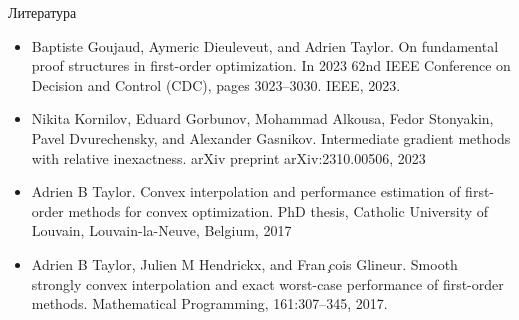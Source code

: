 \documentclass{beamer}
\begin{document}
\begin{frame}{Литература}

\begin{itemize}
 \item Baptiste Goujaud, Aymeric Dieuleveut, and Adrien Taylor. On fundamental proof structures in first-order
optimization. In 2023 62nd IEEE Conference on Decision and Control (CDC), pages 3023–3030. IEEE,
2023.
 \item Nikita Kornilov, Eduard Gorbunov, Mohammad Alkousa, Fedor Stonyakin, Pavel Dvurechensky, and Alexander Gasnikov. Intermediate gradient methods with relative inexactness. arXiv preprint arXiv:2310.00506, 2023
 \item Adrien B Taylor. Convex interpolation and performance estimation of first-order methods for convex optimization. PhD thesis, Catholic University of Louvain, Louvain-la-Neuve, Belgium, 2017
 \item Adrien B Taylor, Julien M Hendrickx, and Fran ̧cois Glineur. Smooth strongly convex interpolation and exact worst-case performance of first-order methods. Mathematical Programming, 161:307–345, 2017.
\end{itemize}

\end{frame}
\end{document}
